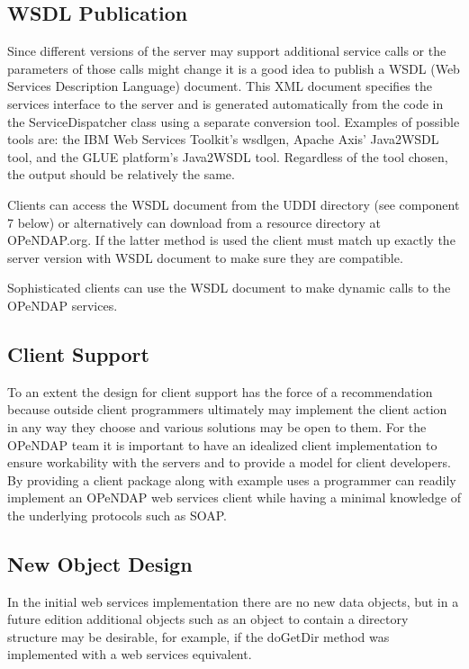 \documentclass[justify]{dods-paper}
\begin{document}
\subsection{WSDL Publication}

Since different versions of the server may support additional service calls or the parameters of those calls might change it is a good idea to publish a WSDL (Web Services Description Language) document. This XML document specifies the services interface to the server and is generated automatically from the code in the ServiceDispatcher class using a separate conversion tool. Examples of possible tools are: the IBM Web Services Toolkit's wsdlgen, Apache Axis' Java2WSDL tool, and the GLUE platform's Java2WSDL tool. Regardless of the tool chosen, the output should be relatively the same.

Clients can access the WSDL document from the UDDI directory (see component 7 below) or alternatively can download from a resource directory at OPeNDAP.org. If the latter method is used the client must match up exactly the server version with WSDL document to make sure they are compatible.

Sophisticated clients can use the WSDL document to make dynamic calls to the OPeNDAP services.


\subsection{Client Support}

To an extent the design for client support has the force of a recommendation because outside client programmers ultimately may implement the client action in any way they choose and various solutions may be open to them. For the OPeNDAP team it is important to have an idealized client implementation to ensure workability with the servers and to provide a model for client developers. By providing a client package along with example uses a programmer can readily implement an OPeNDAP web services client while having a minimal knowledge of the underlying protocols such as SOAP.

\subsection{New Object Design}

In the initial web services implementation there are no new data objects, but in a future edition additional objects such as an object to contain a directory structure may be desirable, for example, if the doGetDir method was implemented with a web services equivalent.
\end{document}
